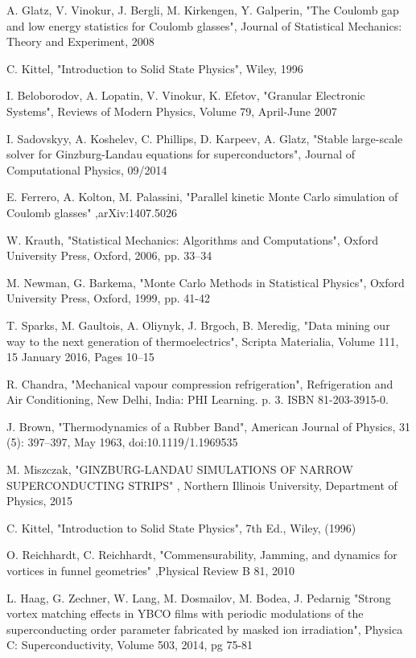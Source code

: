 \begin{thebibliography}{10}
 A. Glatz, V. Vinokur, J. Bergli, M. Kirkengen, Y. Galperin, "The Coulomb gap and low energy statistics for Coulomb glasses", Journal of Statistical Mechanics: Theory and Experiment, 2008

 C. Kittel, "Introduction to Solid State Physics", Wiley, 1996

 I. Beloborodov, A. Lopatin, V. Vinokur, K. Efetov, "Granular Electronic Systems", Reviews of Modern Physics, Volume 79, April-June 2007

 I. Sadovskyy, A. Koshelev, C. Phillips, D. Karpeev, A. Glatz, "Stable large-scale solver for Ginzburg-Landau equations for superconductors", Journal of Computational Physics, 09/2014

 E. Ferrero, A. Kolton, M. Palassini, "Parallel kinetic Monte Carlo simulation of Coulomb glasses" ,arXiv:1407.5026

 W. Krauth, "Statistical Mechanics: Algorithms and Computations", Oxford University Press, Oxford, 2006, pp. 33–34

 M. Newman, G. Barkema, "Monte Carlo Methods in Statistical Physics", Oxford University Press, Oxford, 1999, pp. 41-42

 T. Sparks, M. Gaultois, A. Oliynyk, J. Brgoch, B. Meredig, "Data mining our way to the next generation of thermoelectrics", Scripta Materialia, Volume 111, 15 January 2016, Pages 10–15

 R. Chandra, "Mechanical vapour compression refrigeration", Refrigeration and Air Conditioning, New Delhi, India: PHI Learning. p. 3. ISBN 81-203-3915-0.

 J. Brown, "Thermodynamics of a Rubber Band", American Journal of Physics, 31 (5): 397–397, May 1963, doi:10.1119/1.1969535

 M. Miszczak, "GINZBURG-LANDAU SIMULATIONS OF NARROW SUPERCONDUCTING STRIPS" , Northern Illinois University, Department of Physics, 2015

 C. Kittel, "Introduction to Solid State Physics", 7th Ed., Wiley, (1996)

 O. Reichhardt, C. Reichhardt, "Commensurability, Jamming, and dynamics for vortices in funnel geometries" ,Physical Review B 81, 2010

 L. Haag, G. Zechner, W. Lang, M. Dosmailov, M. Bodea, J. Pedarnig "Strong vortex matching effects in YBCO films with periodic modulations of the superconducting order parameter fabricated by masked ion irradiation", Physica C: Superconductivity, Volume 503, 2014, pg 75-81


\end{thebibliography}
